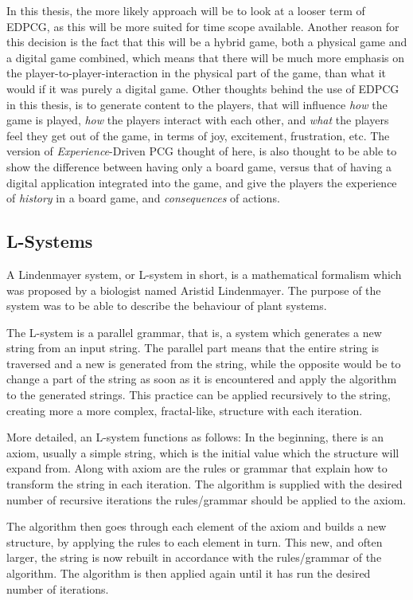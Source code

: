 In this thesis, the more likely approach will be to look at a looser term of EDPCG, as this will be more suited for time scope available.
Another reason for this decision is the fact that this will be a hybrid game, both a physical game and a digital game combined, which means that there will be much more emphasis on the player-to-player-interaction in the physical part of the game, than what it would if it was purely a digital game. Other thoughts behind the use of EDPCG in this thesis, is to generate content to the players, that will influence \textit{how} the game is played, \textit{how} the players interact with each other, and \textit{what} the players feel they get out of the game, in terms of joy, excitement, frustration, etc. 
The version of \textit{Experience}-Driven PCG thought of here, is also thought to be able to show the difference between having only a board game, versus that of having a digital application integrated into the game, and give the players the experience of \textit{history} in a board game, and \textit{consequences} of actions.

\subsection{L-Systems}
A Lindenmayer system, or L-system in short, is a mathematical formalism which was proposed by a biologist named Aristid Lindenmayer\cite{web:lsys}. The purpose of the system was to be able to describe the behaviour of plant systems.

The L-system is a parallel grammar, that is, a system which generates a new string from an input string. The parallel part means that the entire string is traversed and a new is generated from the string, while the opposite would be to change a part of the string as soon as it is encountered and apply the algorithm to the generated strings. 
This practice can be applied recursively to the string, creating more a more complex, fractal-like, structure with each iteration. 

More detailed, an L-system functions as follows:
In the beginning, there is an axiom, usually a simple string, which is the initial value which the structure will expand from.
Along with axiom are the rules or grammar that explain how to transform the string in each iteration. 
The algorithm is supplied with the desired number of recursive iterations the rules/grammar should be applied to the axiom.

The algorithm then goes through each element of the axiom and builds a new structure, by applying the rules to each element in turn. This new, and often larger, the string is now rebuilt in accordance with the rules/grammar of the algorithm.
The algorithm is then applied again until it has run the desired number of iterations.

